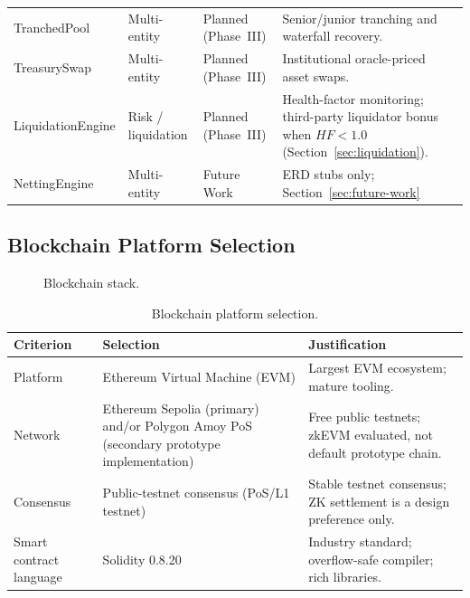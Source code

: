 \begin{table}[H]
\begin{tabular}{@{}>{\raggedright\arraybackslash}p{2.75cm}>{\raggedright\arraybackslash}p{1.85cm}>{\raggedright\arraybackslash}p{1.65cm}>{\raggedright\arraybackslash}p{6.85cm}@{}}
TranchedPool & Multi-entity & Planned (Phase~III) & Senior/junior tranching and waterfall recovery. \\
TreasurySwap & Multi-entity & Planned (Phase~III) & Institutional oracle-priced asset swaps. \\
LiquidationEngine & Risk / liquidation & Planned (Phase~III) & Health-factor monitoring; third-party liquidator bonus when $HF < 1.0$ (Section~\ref{sec:liquidation}). \\
NettingEngine & Multi-entity & Future Work & ERD stubs only; Section~\ref{sec:future-work} \\
\bottomrule
\end{tabular}
\end{table}

\subsection{Blockchain Platform Selection}

\begin{figure}[H]
\centering
{}
\caption[Blockchain stack]{Blockchain stack.}
\label{fig:blockchain-stack}
\end{figure}


\begin{table}[H]
\centering
\caption[Blockchain platform selection]{Blockchain platform selection.}
\label{tab:blockchain-selection}
\begin{tabular}{p{3.5cm}p{3.5cm}p{6.5cm}}
\toprule
\tableheadcolor
\textbf{Criterion} & \textbf{Selection} & \textbf{Justification} \\
\midrule
Platform & Ethereum Virtual Machine (EVM) & Largest EVM ecosystem; mature tooling. \\
Network & Ethereum Sepolia (primary) and/or Polygon Amoy PoS (secondary prototype implementation) & Free public testnets; zkEVM evaluated, not default prototype chain. \\
Consensus & Public-testnet consensus (PoS/L1 testnet) & Stable testnet consensus; ZK settlement is a design preference only. \\
Smart contract language & Solidity 0.8.20 & Industry standard; overflow-safe compiler; rich libraries. \\
\bottomrule
\end{tabular}
\end{table}

